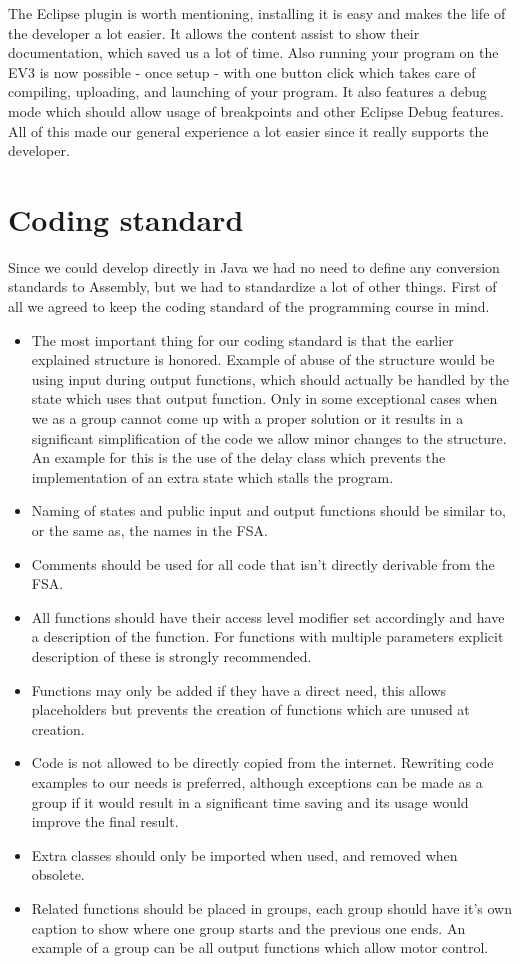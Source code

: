 The Eclipse plugin is worth mentioning, installing it is easy and makes the life of the developer a lot easier. It allows the content assist to show their documentation, which saved us a lot of time. Also running your program on the EV3 is now possible - once setup - with one button click which takes care of compiling, uploading, and launching of your program. It also features a debug mode which should allow usage of breakpoints and other Eclipse Debug features. All of this made our general experience a lot easier since it really supports the developer.


\section{Coding standard} \label{software-implementation:coding-standard}
Since we could develop directly in Java we had no need to define any conversion standards to Assembly, but we had to standardize a lot of other things. First of all we agreed to keep the coding standard of the programming course in mind.
\begin{itemize}
	\item The most important thing for our coding standard is that the earlier explained structure is honored. Example of abuse of the structure would be using input during output functions, which should actually be handled by the state which uses that output function. Only in some exceptional cases when we as a group cannot come up with a proper solution or it results in a significant simplification of the code we allow minor changes to the structure. An example for this is the use of the delay class which prevents the implementation of an extra state which stalls the program.
    \item Naming of states and public input and output functions should be similar to, or the same as, the names in the FSA.
    \item Comments should be used for all code that isn't directly derivable from the FSA.
    \item All functions should have their access level modifier set accordingly and have a description of the function. For functions with multiple parameters explicit description of these is strongly recommended.
    \item Functions may only be added if they have a direct need, this allows placeholders but prevents the creation of functions which are unused at creation.
    \item Code is not allowed to be directly copied from the internet. Rewriting code examples to our needs is preferred, although exceptions can be made as a group if it would result in a significant time saving and its usage would improve the final result.
    \item Extra classes should only be imported when used, and removed when obsolete.
    \item Related functions should be placed in groups, each group should have it's own caption to show where one group starts and the previous one ends. An example of a group can be all output functions which allow motor control.
\end{itemize}


